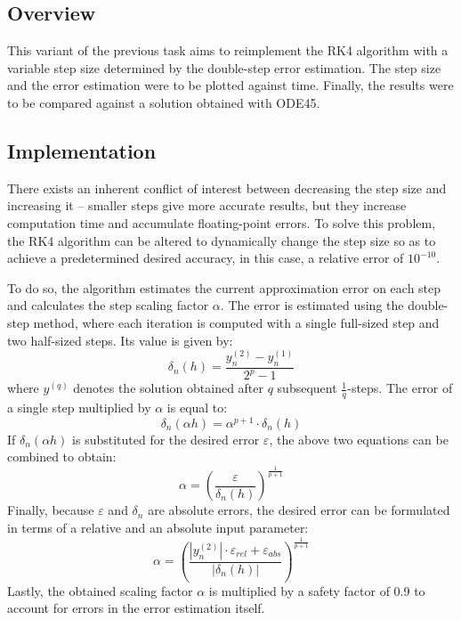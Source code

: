 \documentclass{article}
\begin{document}
	\subsection{Overview}
	
	This variant of the previous task aims to reimplement the RK4 algorithm
	with a variable step size determined by the double-step error
	estimation. The step size and the error estimation were to be plotted
	against time. Finally, the results were to be compared against a
	solution obtained with ODE45.
	
	\subsection{Implementation}
	
	There exists an inherent conflict of interest between decreasing the
	step size and increasing it -- smaller steps give more accurate results,
	but they increase computation time and accumulate floating-point errors.
	To solve this problem, the RK4 algorithm can be altered to dynamically
	change the step size so as to achieve a predetermined desired accuracy,
	in this case, a relative error of $10^{-10}$.
	
	To do so, the algorithm estimates the current approximation error on
	each step and calculates the step scaling factor $\alpha$. The error is
	estimated using the double-step method, where each iteration is computed
	with a single full-sized step and two half-sized steps. Its value is
	given by:
	\begin{equation}
		\delta_n(h) = \frac{y^{(2)}_n - y^{(1)}_n}{2^p - 1}
	\end{equation}
	where $y^{(q)}$ denotes the solution obtained after $q$ subsequent
	$\frac{1}{q}$-steps. The error of a single step multiplied by $\alpha$
	is equal to:
	\begin{equation}
		\delta_n(\alpha h) = \alpha^{p + 1} \cdot \delta_n(h)
	\end{equation}
	If $\delta_n(\alpha h)$ is substituted for the desired error
	$\varepsilon$, the above two equations can be combined to obtain:
	\begin{equation}
		\alpha = \left(\frac{\varepsilon}{\delta_n(h)}\right)
		^\frac{1}{p + 1}
	\end{equation}
	Finally, because $\varepsilon$ and $\delta_n$ are absolute errors, the
	desired error can be formulated in terms of a relative and an absolute
	input parameter:
		\begin{equation}
		\alpha = \left(\frac
		{|y^{(2)}_n| \cdot \varepsilon_{rel} + \varepsilon_{abs}}
		{|\delta_n(h)|}\right)
		^\frac{1}{p + 1}
	\end{equation}
	Lastly, the obtained scaling factor $\alpha$ is multiplied by a safety
	factor of 0.9 to account for errors in the error estimation itself.
	
\end{document}
